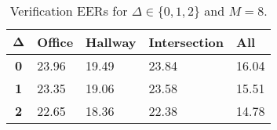 \begin{table}[h]
    \centering
    \begin{tabular}{|c|M{2cm}|M{2cm}|M{2cm}|M{2cm}|}
    \hline
    $\boldsymbol{\Delta}$ & \bf{Office} & \bf{Hallway} & \bf{Intersection} & \bf{All} \\ 
    \hline 
    \hline
    \bf{0} & 23.96 & 19.49 & 23.84 & 16.04 \\
    \hline
    \bf{1} & 23.35 & 19.06 & 23.58 & 15.51 \\
    \hline
    \bf{2} & 22.65 & 18.36 & 22.38 & 14.78 \\
    \hline
    \end{tabular}
    \caption{Verification EERs for $\Delta \in \{0, 1, 2\}$ and $M = 8$.}
    \label{tab:verify_adapted_wmv_M_8}
\end{table}
